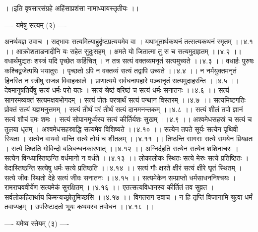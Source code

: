 \documentclass[11pt]{book}
\begin{document}
\begin{landscape}
 ।।इति वृषसारसंग्रहे अहिंसाप्रशंसा नामाध्यायस्तृतीयः ।।





---- यमेषु सत्यम् (२) ----

अनर्थयज्ञ उवाच ।
सद्भावः सत्यमित्याहुर्दृष्टप्रत्ययमेव वा ।
यथाभूतार्थकथनं तत्सत्यकथनं स्मृतम् ।।४.१ ।।
आक्रोशताडनादीनि यः सहेत सुदुःसहम् ।
क्षमते यो जितात्मा तु स च सत्यमुदाहृतम् ।।४.२ ।।
वधार्थमुद्यतः शस्त्रं यदि पृच्छेत कर्हिचित् ।
न तत्र सत्यं वक्तव्यमनृतं सत्यमुच्यते ।।४.३ ।।
वधार्हः पुरुषः कश्चिद्व्रजेत्पथि भयातुरः ।
पृच्छतो ऽपि न वक्तव्यं सत्यं तद्वापि उच्यते ।।४.४ ।।
न नर्मयुक्तमनृतं हिनस्ति
न स्त्रीषु राजन्न विवाहकाले ।
प्राणात्यये सर्वधनापहारे
पञ्चानृतं सत्यमुदाहरन्ति ।।४.५ ।।
देवमानुषतिर्येषु सत्यं धर्मः परो यतः ।
सत्यं श्रेष्ठं वरिष्ठं च सत्यं धर्मः सनातनः ।।४.६ ।।
सत्यं सागरमव्यक्तं सत्यमक्षयभोगदम् ।
सत्यं पोतः परत्रार्थं सत्यं पन्थान विस्तरम् ।।४.७ ।।
सत्यमिष्टगतिः प्रोक्तं सत्यं यज्ञमनुत्तमम् ।
सत्यं तीर्थं परं तीर्थं सत्यं दानमनन्तकम् ।।४.८ ।।
सत्यं शीलं तपो ज्ञानं सत्यं शौचं दमः शमः ।
सत्यं सोपानमूर्ध्वस्य सत्यं कीर्तिर्यशः सुखम् ।।४.९ ।।
अश्वमेधसहस्रं च सत्यं च तुलया धृतम् ।
अश्वमेधसहस्राद्धि सत्यमेव विशिष्यते ।।४.१० ।।
सत्येन तपते सूर्यः सत्येन पृथिवी स्थिता ।
सत्येन वायवो वान्ति सत्ये तोयं च शीतलम् ।।४.११ ।।
तिष्ठन्ति सागराः सत्ये समयेन प्रियव्रतः ।
सत्ये तिष्ठति गोविन्दो बलिबन्धनकारणात् ।।४.१२ ।।
अग्निर्दहति सत्येन सत्येन शशिनाचरः ।
सत्येन विन्ध्यास्तिष्ठन्ति वर्धमानो न वर्धते ।।४.१३ ।।
लोकालोकः स्थितः सत्ये मेरुः सत्ये प्रतिष्ठितः ।
वेदास्तिष्ठन्ति सत्येषु धर्मः सत्ये प्रतिष्ठति ।।४.१४ ।।
सत्यं गौः क्षरते क्षीरं सत्यं क्षीरे घृतं स्थितम् ।
सत्ये जीवः स्थितो देहे सत्यं जीवः सनातनः ।।४.१५ ।।
सत्यमेकेन सम्प्राप्तो धर्मसाधननिश्चयः ।
रामराघववीर्येण सत्यमेकं सुरक्षितम् ।।४.१६ ।।
एतत्सत्यविधानस्य कीर्तितं तव सुव्रत ।
सर्वलोकहितार्थाय किमन्यच्छ्रोतुमिच्छसि ।।४.१७ ।।
विगतराग उवाच ।
न हि तृप्तिं विजानामि श्रुत्वा धर्मं तवाप्यहम् ।
उपरिष्टादतो भूयः कथयस्व तपोधन ।।४.१८ ।।

---- यमेष्व{ }स्तेयम् (३) ----


\end{landscape}
\end{document}
